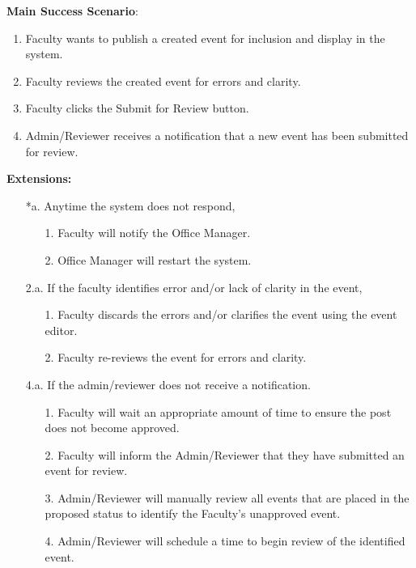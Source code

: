 \documentclass{article}
\begin{document}
    \textbf{Main Success Scenario}:
    \begin{enumerate}
        \item Faculty wants to publish a created event for inclusion and display in the system.
        \item Faculty reviews the created event for errors and clarity.
        \item Faculty clicks the Submit for Review button.
        \item Admin/Reviewer receives a notification that a new event has been submitted for review.
    \end{enumerate}
    \textbf{Extensions:}
    \begin{enumerate}
        \item[*a.] Anytime the system does not respond,
        \begin{enumerate}
            \item[1.] Faculty will notify the Office Manager.
            \item[2.] Office Manager will restart the system.
        \end{enumerate}
        \item [2.a.]  If the faculty identifies error and/or lack of clarity in the event,
        \begin{enumerate}
            \item[1.] Faculty discards the errors and/or clarifies the event using the event editor.
            \item[2.] Faculty re-reviews the event for errors and clarity.
        \end{enumerate}
        \item[4.a.]  If the admin/reviewer does not receive a notification.
        \begin{enumerate}
            \item[1.] Faculty will wait an appropriate amount of time to ensure the post does not become approved.
            \item[2.] Faculty will inform the Admin/Reviewer that they have submitted an event for review.
            \item[3.] Admin/Reviewer will manually review all events that are placed in the proposed status to identify the Faculty’s unapproved event.
            \item[4.] Admin/Reviewer will schedule a time to begin review of the identified event.
        \end{enumerate}
    \end{enumerate}
\end{document}
